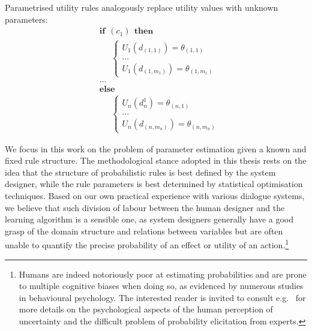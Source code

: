 Parametrised utility rules analogously replace utility values with unknown parameters:
\begin{equation}
\begin{aligned}
& \textbf{if} \ \ (c_{1}) \ \ \textbf{then} \\ 
& \;\;\;\;\; \begin{cases}
U_1(d_{(1,1)}) = \theta_{(1,1)} \\
 \dots \\
U_1(d_{(1,m_1)}) = \theta_{(1,m_1)}
\end{cases} \\[3mm]
& \dots  \\
& \textbf{else} \\
& \;\;\;\;\; \begin{cases}
U_n(d_n^1) = \theta_{(n,1)} \\
\dots \\
U_n(d_{(n,m_n)}) = \theta_{(n,m_n)}
\end{cases}
\end{aligned}
\end{equation} 

We focus in this work on the problem of parameter estimation given a known and fixed rule structure.  The methodological stance adopted in this thesis rests on the idea that the structure of probabilistic rules is best defined by the system designer, while the rule parameters is best determined by statistical optimisation techniques. Based on our own practical experience with various dialogue systems, we believe that such division of labour between the human designer and the learning algorithm is a sensible one, as system designers generally have a good grasp of the domain structure and relations between variables but are often unable to quantify the precise probability of an effect or utility of an action.\footnote{Humans are indeed notoriously poor at estimating probabilities and are prone to multiple cognitive biases when doing so, as evidenced by numerous studies in behavioural psychology.  The interested reader is invited to consult e.g.\ \cite{KahnemanSlovicTversky81,morganhenrion} for more details on the psychological aspects of the human perception of uncertainty and the difficult problem of probability elicitation from experts.}


